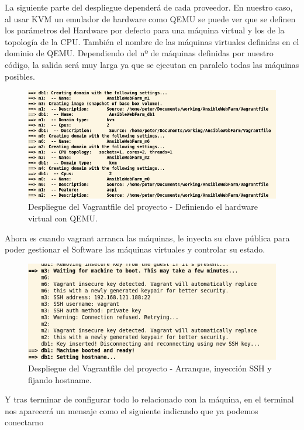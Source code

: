 La siguiente parte del despliegue dependerá de cada proveedor. En nuestro caso, al usar KVM un emulador de hardware como QEMU se puede ver que se definen los parámetros del Hardware por defecto para una máquina virtual y los de la topología de la CPU. También el nombre de las
máquinas virtuales definidas en el dominio de QEMU. Dependiendo del nº de máquinas definidas por nuestro código, la salida será muy larga ya que se ejecutan en paralelo todas las máquinas posibles.

\begin{figure}[H]
	\centering
	\includegraphics[scale=0.35]{img/vagrant3}
	\caption{Despliegue del Vagrantfile del proyecto - Definiendo el hardware virtual con QEMU.}
\end{figure}

Ahora es cuando vagrant arranca las máquinas, le inyecta su clave pública para poder gestionar el Software las máquinas virtuales y controlar su estado.

\begin{figure}[H]
	\centering
	\includegraphics[scale=0.35]{img/vagrant4}
	\caption{Despliegue del Vagrantfile del proyecto - Arranque, inyección SSH y fijando hostname.}
\end{figure}

Y tras terminar de configurar todo lo relacionado con la máquina, en el terminal nos aparecerá un mensaje como el siguiente indicando que ya podemos conectarno


